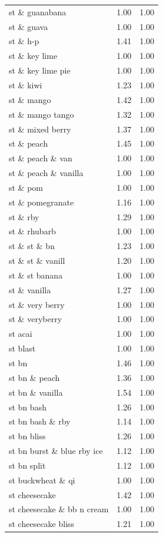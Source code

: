 \begin{table}
\begin{tabular}{lrr}
st \& guanabana & 1.00 & 1.00 \\
st \& guava & 1.00 & 1.00 \\
st \& h-p & 1.41 & 1.00 \\
st \& key lime & 1.00 & 1.00 \\
st \& key lime pie & 1.00 & 1.00 \\
st \& kiwi & 1.23 & 1.00 \\
st \& mango & 1.42 & 1.00 \\
st \& mango tango & 1.32 & 1.00 \\
st \& mixed berry & 1.37 & 1.00 \\
st \& peach & 1.45 & 1.00 \\
st \& peach \& van & 1.00 & 1.00 \\
st \& peach \& vanilla & 1.00 & 1.00 \\
st \& pom & 1.00 & 1.00 \\
st \& pomegranate & 1.16 & 1.00 \\
st \& rby & 1.29 & 1.00 \\
st \& rhubarb & 1.00 & 1.00 \\
st \& st \& bn & 1.23 & 1.00 \\
st \& st \& vanill & 1.20 & 1.00 \\
st \& st banana & 1.00 & 1.00 \\
st \& vanilla & 1.27 & 1.00 \\
st \& very berry & 1.00 & 1.00 \\
st \& veryberry & 1.00 & 1.00 \\
st acai & 1.00 & 1.00 \\
st blast & 1.00 & 1.00 \\
st bn & 1.46 & 1.00 \\
st bn \& peach & 1.36 & 1.00 \\
st bn \& vanilla & 1.54 & 1.00 \\
st bn bash & 1.26 & 1.00 \\
st bn bash \& rby & 1.14 & 1.00 \\
st bn bliss & 1.26 & 1.00 \\
st bn burst \& blue rby ice & 1.12 & 1.00 \\
st bn split & 1.12 & 1.00 \\
st buckwheat \& qi & 1.00 & 1.00 \\
st cheesecake & 1.42 & 1.00 \\
st cheesecake \& bb n cream & 1.00 & 1.00 \\
st cheesecake bliss & 1.21 & 1.00 \\

\end{tabular}
\end{table}
